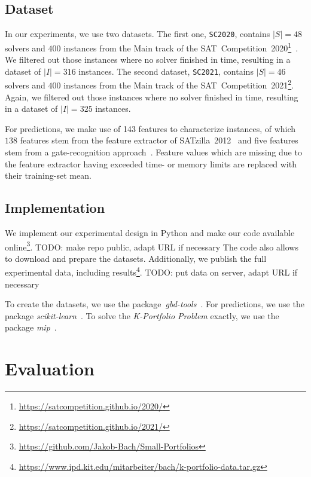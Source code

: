 \documentclass[conference]{IEEEtran}
\newcommand{\todo}[1]{{\color{red}TODO: #1}}
\begin{document}
\subsection{Dataset}

In our experiments, we use two datasets.
The first one, \texttt{SC2020}, contains $|S| = 48$ solvers and $400$ instances from the Main track of the SAT~Competition~2020\footnote{\url{https://satcompetition.github.io/2020/}}~\cite{balyo2020proceedings, SC2020:AIJ}.
We filtered out those instances where no solver finished in time, resulting in a dataset of $|I| = 316$ instances. 
The second dataset, \texttt{SC2021}, contains $|S| = 46$ solvers and $400$ instances from the Main track of the SAT~Competition~2021\footnote{\url{https://satcompetition.github.io/2021/}}.
Again, we filtered out those instances where no solver finished in time, resulting in a dataset of $|I| = 325$ instances.

For predictions, we make use of 143 features to characterize instances, of which 
$138$ features stem from the feature extractor of SATzilla~2012~\cite{xu2008satzilla, xu2012satzilla2012} and five features stem from a gate-recognition approach~\cite{Iser:2015:GateRecognition}. 
Feature values which are missing due to the feature extractor having exceeded time- or memory limits are replaced with their training-set mean. 

\subsection{Implementation}

We implement our experimental design in Python and make our code available online\footnote{\url{https://github.com/Jakob-Bach/Small-Portfolios}}.
\todo{make repo public, adapt URL if necessary}
The code also allows to download and prepare the datasets.
Additionally, we publish the full experimental data, including results\footnote{\url{https://www.ipd.kit.edu/mitarbeiter/bach/k-portfolio-data.tar.gz}}.
\todo{put data on server, adapt URL if necessary}

To create the datasets, we use the package~\emph{gbd-tools}~\cite{iser2020collaborative}.
For predictions, we use the package \emph{scikit-learn}~\cite{scikit-learn}.
To solve the \emph{K-Portfolio Problem} exactly, we use the package \emph{mip}~\cite{python-mip}.

\section{Evaluation}
\label{sec:evaluation}
\end{document}
